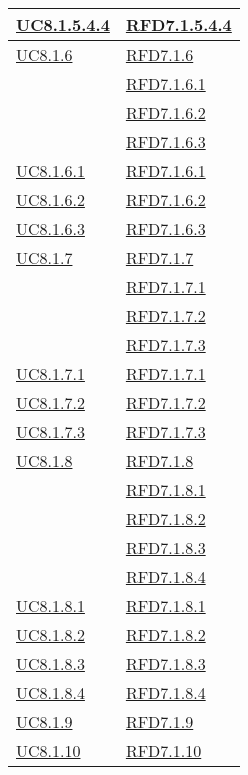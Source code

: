 \begin{longtable}{|>{\centering}m{5cm}|m{5cm}<{\centering}|}
\hyperref[UC8.1.5.4.4]{UC8.1.5.4.4} & \hyperlink{RFD7.1.5.4.4}{RFD7.1.5.4.4}\\ \hline
\hyperref[UC8.1.6]{UC8.1.6} & \hyperlink{RFD7.1.6}{RFD7.1.6}\\
& \hyperlink{RFD7.1.6.1}{RFD7.1.6.1}\\
& \hyperlink{RFD7.1.6.2}{RFD7.1.6.2}\\
& \hyperlink{RFD7.1.6.3}{RFD7.1.6.3}\\ \hline
\hyperref[UC8.1.6.1]{UC8.1.6.1} & \hyperlink{RFD7.1.6.1}{RFD7.1.6.1}\\ \hline
\hyperref[UC8.1.6.2]{UC8.1.6.2} & \hyperlink{RFD7.1.6.2}{RFD7.1.6.2}\\ \hline
\hyperref[UC8.1.6.3]{UC8.1.6.3} & \hyperlink{RFD7.1.6.3}{RFD7.1.6.3}\\ \hline
\hyperref[UC8.1.7]{UC8.1.7} & \hyperlink{RFD7.1.7}{RFD7.1.7}\\
& \hyperlink{RFD7.1.7.1}{RFD7.1.7.1}\\
& \hyperlink{RFD7.1.7.2}{RFD7.1.7.2}\\
& \hyperlink{RFD7.1.7.3}{RFD7.1.7.3}\\ \hline
\hyperref[UC8.1.7.1]{UC8.1.7.1} & \hyperlink{RFD7.1.7.1}{RFD7.1.7.1}\\ \hline
\hyperref[UC8.1.7.2]{UC8.1.7.2} & \hyperlink{RFD7.1.7.2}{RFD7.1.7.2}\\ \hline
\hyperref[UC8.1.7.3]{UC8.1.7.3} & \hyperlink{RFD7.1.7.3}{RFD7.1.7.3}\\ \hline
\hyperref[UC8.1.8]{UC8.1.8} & \hyperlink{RFD7.1.8}{RFD7.1.8}\\
& \hyperlink{RFD7.1.8.1}{RFD7.1.8.1}\\
& \hyperlink{RFD7.1.8.2}{RFD7.1.8.2}\\
& \hyperlink{RFD7.1.8.3}{RFD7.1.8.3}\\
& \hyperlink{RFD7.1.8.4}{RFD7.1.8.4}\\ \hline
\hyperref[UC8.1.8.1]{UC8.1.8.1} & \hyperlink{RFD7.1.8.1}{RFD7.1.8.1}\\ \hline
\hyperref[UC8.1.8.2]{UC8.1.8.2} & \hyperlink{RFD7.1.8.2}{RFD7.1.8.2}\\ \hline
\hyperref[UC8.1.8.3]{UC8.1.8.3} & \hyperlink{RFD7.1.8.3}{RFD7.1.8.3}\\ \hline
\hyperref[UC8.1.8.4]{UC8.1.8.4} & \hyperlink{RFD7.1.8.4}{RFD7.1.8.4}\\ \hline
\hyperref[UC8.1.9]{UC8.1.9} & \hyperlink{RFD7.1.9}{RFD7.1.9}\\ \hline
\hyperref[UC8.1.10]{UC8.1.10} & \hyperlink{RFD7.1.10}{RFD7.1.10}\\ \hline

\end{longtable}
